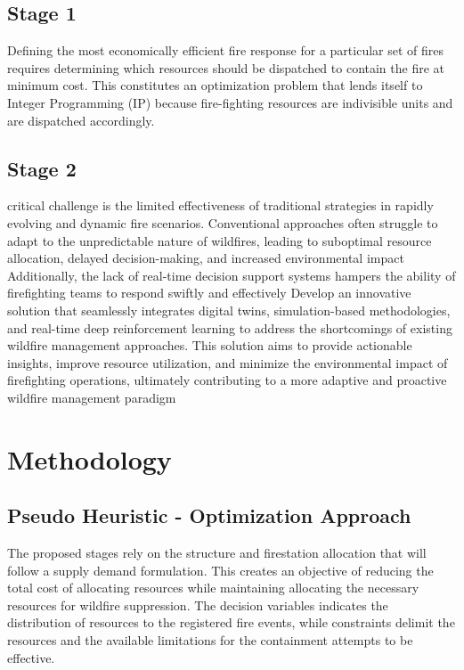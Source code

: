 \documentclass[lettersize,journal]{IEEEtran}
\begin{document}
\subsection{Stage 1}
Defining the most economically efficient fire response for a particular set of fires requires determining which resources should be dispatched to contain the fire at minimum cost. This constitutes an optimization problem that lends itself to Integer Programming (IP) because fire-fighting resources are indivisible units and are dispatched accordingly.


\subsection{Stage 2}

critical challenge is the limited effectiveness of traditional strategies in rapidly evolving and dynamic fire scenarios. Conventional approaches often struggle to adapt to the unpredictable nature of wildfires, leading to suboptimal resource allocation, delayed decision-making, and increased environmental impact
Additionally, the lack of real-time decision support systems hampers the ability of firefighting teams to respond swiftly and effectively
Develop an innovative solution that seamlessly integrates digital twins, simulation-based methodologies, and real-time deep reinforcement learning to address the shortcomings of existing wildfire management approaches. This solution aims to provide actionable insights, improve resource utilization, and minimize the environmental impact of firefighting operations, ultimately contributing to a more adaptive and proactive wildfire management paradigm


\section{Methodology}\label{Methodology}


\subsection*{Pseudo Heuristic - Optimization Approach}\label{Pseudo Heuristic - Optimization Approach}

The proposed stages rely on the structure and firestation allocation that will follow a supply demand formulation. This creates an objective of reducing the total cost of allocating resources while maintaining allocating the necessary resources for wildfire suppression. The decision variables indicates the distribution of resources to the registered fire events, while constraints delimit the resources and the available limitations for the containment attempts to be effective.\\
\end{document}
